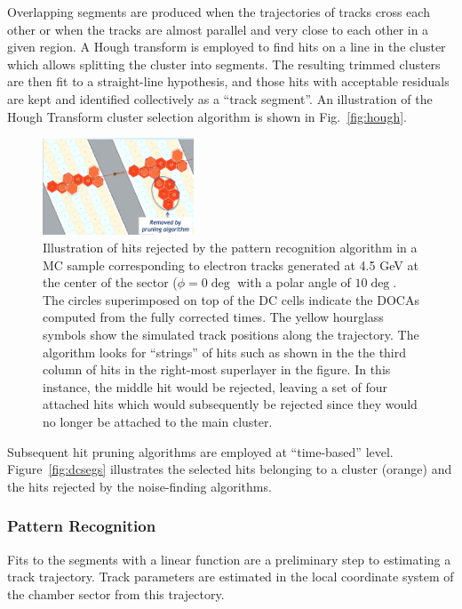 Overlapping segments are produced when the trajectories of tracks cross each other
or when the tracks are almost parallel and very close to each other in a given region.
A Hough transform is employed to find hits on a line in the cluster which allows splitting the cluster into
segments.  The resulting trimmed clusters are then fit to a straight-line hypothesis, and those hits with
acceptable residuals are kept and identified collectively as a ``track segment''. An illustration of the Hough Transform cluster selection algorithm is shown in Fig.~\ref{fig:hough}.

\begin{figure}
\centering
\includegraphics[width=0.4\textwidth]{pics/dcPattern2.png}
\caption{
Illustration of hits rejected by the pattern recognition algorithm in a MC sample corresponding to electron tracks generated at 4.5 GeV at the center of the sector ($\phi = 0\deg$ with a polar angle of $10\deg$. 
The circles superimposed on top of the DC cells indicate the DOCAs computed from the fully corrected times.  The yellow hourglass symbols show the simulated track positions along the trajectory.   
The algorithm looks for ``strings'' of hits such as shown in the the third column of hits in the right-most superlayer in the figure.  
In this instance, the middle hit would be rejected, leaving a set of four attached hits which would subsequently be rejected since they would no longer be attached to the main cluster. 
}
\label{fig:strings}
\end{figure}
Subsequent hit pruning algorithms are employed at ``time-based'' level.  
Figure~\ref{fig:dcsegs} illustrates the selected hits belonging to a cluster (orange) and the hits
rejected by the noise-finding algorithms.

\subsubsection{Pattern Recognition}
Fits to the segments with a linear function are a preliminary step to estimating
a track trajectory. Track parameters are estimated in the local coordinate system of the chamber sector from
this trajectory.


